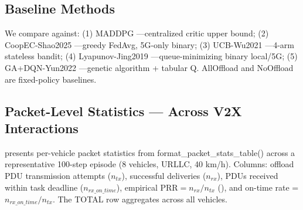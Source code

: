\subsection{Baseline Methods}

We compare against: (1) MADDPG \cite{lowe2017}---centralized critic upper bound; (2) CoopEC-Shao2025 \cite{shao2025}---greedy FedAvg, 5G-only binary; (3) UCB-Wu2021 \cite{wu2021}---4-arm stateless bandit; (4) Lyapunov-Jing2019 \cite{jing2019}---queue-minimizing binary local/5G; (5) GA+DQN-Yun2022 \cite{yun2022}---genetic algorithm + tabular Q. AllOffload and NoOffload are fixed-policy baselines.

\subsection{Packet-Level Statistics --- Across V2X Interactions}

 presents per-vehicle packet statistics from format\_packet\_stats\_table() across a representative 100-step episode (8 vehicles, URLLC, 40 km/h). Columns: offload PDU transmission attempts ($n_{tx}$), successful deliveries ($n_{rx}$), PDUs received within task deadline ($n_{rx\_on\_time}$), empirical $\text{PRR} = n_{rx}/n_{tx}$ (), and on-time rate = $n_{rx\_on\_time}/n_{tx}$. The TOTAL row aggregates across all vehicles.

\begin{table}[htbp]
\caption{Packet Statistics --- format\_packet\_stats\_table() Output (8 vehicles, 100-step episode, 40 km/h, URLLC)}
\label{tab:packet_stats}
\centering
{}
\end{table}

